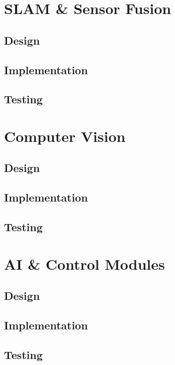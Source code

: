\section{SLAM \& Sensor Fusion}\label{soft/SLAM}

\subsection{Design}\label{soft/SLAM/design}

\subsection{Implementation}\label{soft/SLAM/impl}

\subsection{Testing}\label{soft/SLAM/test}



\section{Computer Vision}\label{soft/cv}

\subsection{Design}\label{soft/cv/design}

\subsection{Implementation}\label{soft/cv/impl}

\subsection{Testing}\label{soft/cv/test}



\section{AI \& Control Modules}\label{soft/ai}

\subsection{Design}\label{soft/ai/design}

\subsection{Implementation}\label{soft/ai/impl}

\subsection{Testing}\label{soft/ai/test}
